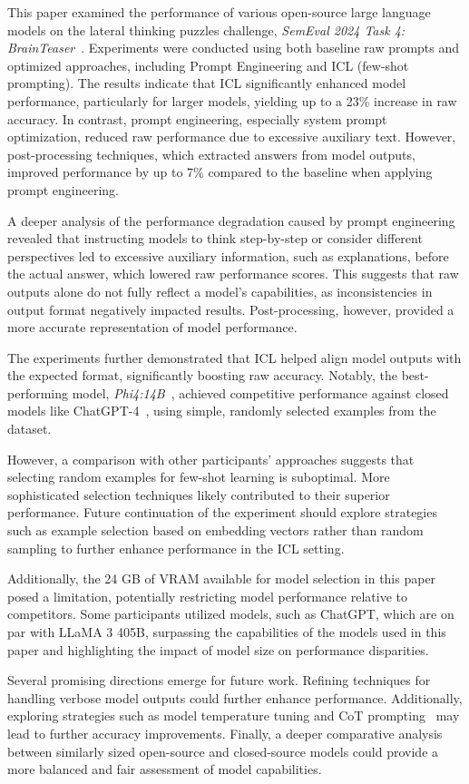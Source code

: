 This paper examined the performance of various open-source large language models on the lateral thinking puzzles challenge, \textit{SemEval 2024 Task 4: BrainTeaser}~\cite{jiangBRAINTEASERLateralThinking2023}. Experiments were conducted using both baseline raw prompts and optimized approaches, including Prompt Engineering and \acf{ICL} (few-shot prompting). The results indicate that \ac{ICL} significantly enhanced model performance, particularly for larger models, yielding up to a 23\% increase in raw accuracy. In contrast, prompt engineering, especially system prompt optimization, reduced raw performance due to excessive auxiliary text. However, post-processing techniques, which extracted answers from model outputs, improved performance by up to 7\% compared to the baseline when applying prompt engineering.

A deeper analysis of the performance degradation caused by prompt engineering revealed that instructing models to think step-by-step or consider different perspectives led to excessive auxiliary information, such as explanations, before the actual answer, which lowered raw performance scores. This suggests that raw outputs alone do not fully reflect a model's capabilities, as inconsistencies in output format negatively impacted results. Post-processing, however, provided a more accurate representation of model performance.

The experiments further demonstrated that \ac{ICL} helped align model outputs with the expected format, significantly boosting raw accuracy. Notably, the best-performing model, \textit{Phi4:14B}~\cite{abdinPhi4TechnicalReport2024}, achieved competitive performance against closed models like ChatGPT-4~\cite{openaiGPT4TechnicalReport2024}, using simple, randomly selected examples from the dataset.

However, a comparison with other participants' approaches suggests that selecting random examples for few-shot learning is suboptimal. More sophisticated selection techniques likely contributed to their superior performance. Future continuation of the experiment should explore strategies such as example selection based on embedding vectors rather than random sampling to further enhance performance in the \ac{ICL} setting.

Additionally, the 24 GB of \acf{VRAM} available for model selection in this paper posed a limitation, potentially restricting model performance relative to competitors. Some participants utilized models, such as ChatGPT, which are on par with LLaMA 3 405B, surpassing the capabilities of the models used in this paper and highlighting the impact of model size on performance disparities.

Several promising directions emerge for future work. Refining techniques for handling verbose model outputs could further enhance performance. Additionally, exploring strategies such as model temperature tuning and \acl{CoT} prompting~\cite{weiChainofThoughtPromptingElicits2023} may lead to further accuracy improvements. Finally, a deeper comparative analysis between similarly sized open-source and closed-source models could provide a more balanced and fair assessment of model capabilities.

